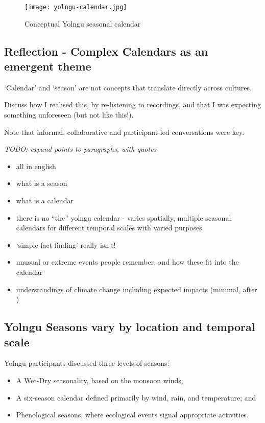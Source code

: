 \begin{figure}[h]
    \centering
    \texttt{[image: yolngu-calendar.jpg]}
    \caption{Conceptual Yolngu seasonal calendar \citep{davis1989}}
    \label{fig:yolngu-seasons}
\end{figure}


\subsection{Reflection - Complex Calendars as an emergent theme}

`Calendar' and `season' are not concepts that translate directly across cultures. 

Discuss how I realised this, by re-listening to recordings, and that I was
expecting something unforeseen (but not like this!).

Note that informal, collaborative and participant-led conversations were key.

\emph{TODO: expand points to paragraphs, with quotes}

\begin{itemize}
\item all in english
\item what is a season
\item what is a calendar
\item there is no ``the'' yolngu calendar - varies spatially,
        multiple seasonal calendars for different temporal scales with varied purposes
\item `simple fact-finding' really isn't!
\item unusual or extreme events people remember, and how these fit into the calendar
\item understandings of climate change including expected impacts (minimal, after \citet{petheram2010})
\end{itemize}



\subsection{Yolngu Seasons vary by location and temporal scale}

Yolngu participants discussed three levels of seasons:
\begin{itemize}
\item A Wet-Dry seasonality, based on the monsoon winds;
\item A six-season calendar defined primarily by wind, rain, and temperature; and
\item Phenological seasons, where ecological events signal appropriate activities.
\end{itemize}

